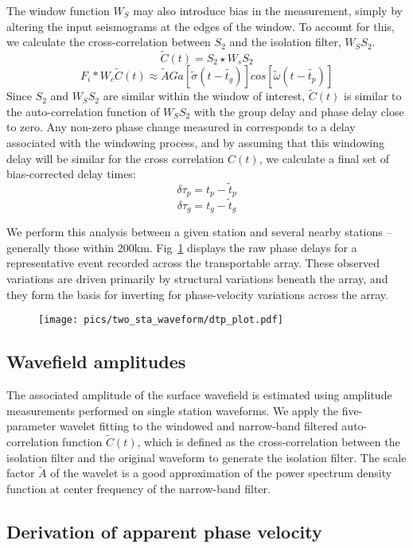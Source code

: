 \documentclass{gji}
\begin{document}
The window function $W_S$ may also introduce bias in the measurement, simply by altering the input seismograms at the edges of the window.  To account for this, we calculate the cross-correlation between $S_2$ and the isolation filter, $W_SS_2$.
\[
\tilde{C}(t) = S_2 \star W_sS_2
\]
\[
F_i \ast W_c \tilde{C}(t) \approx \tilde{A} Ga [\tilde{\sigma}(t-\tilde{t_g})]cos[\tilde{\omega}(t-\tilde{t_p})]
\]
Since $S_2$ and $W_SS_2$ are similar within the window of interest, $\tilde{C}(t)$ is similar to the auto-correlation function of $W_S S_2$ with the group delay and phase delay close to zero. Any non-zero phase change measured in  corresponds to a delay associated with the windowing process, and by assuming that this windowing delay will be similar for the cross correlation $C(t)$, we calculate a final set of bias-corrected delay times:
\[
\delta \tau_p = t_p - \tilde{t}_p 
\]
\[
\delta \tau_g = t_g - \tilde{t}_g
\]

We perform this analysis between a given station and several nearby stations – generally those within 200km.  Fig~\ref{fig:dtp} displays the raw phase delays for a representative event recorded across the transportable array. These observed variations are driven primarily by structural variations beneath the array, and they form the basis for inverting for phase-velocity variations across the array.  

\begin{figure}
	\texttt{[image: pics/two\_sta\_waveform/dtp\_plot.pdf]}
	\caption{}
	\label{fig:dtp}
\end{figure}

\subsection{Wavefield amplitudes}
\label{sec:amp}
The associated amplitude of the surface wavefield is estimated using amplitude measurements performed on single station waveforms. We apply the five-parameter wavelet fitting to the windowed and narrow-band filtered auto-correlation function $\tilde{C}(t)$, which is defined as the cross-correlation between the isolation filter and the original waveform to generate the isolation filter. The scale factor $\tilde{A}$ of the wavelet is a good approximation of the power spectrum density function at center frequency of the narrow-band filter.

\subsection{Derivation of apparent phase velocity}
\label{sec:apv}
\end{document}
